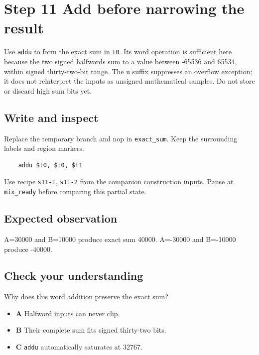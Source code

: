 \section{Step 11 Add before narrowing the result}\label{pcm-s11}

Use \texttt{addu} to form the exact sum in \texttt{t0}. Its word operation is sufficient here because the two signed halfwords sum to a value between -65536 and 65534, within signed thirty-two-bit range. The u suffix suppresses an overflow exception; it does not reinterpret the inputs as unsigned mathematical samples. Do not store or discard high sum bits yet.

\subsection{Write and inspect}
Replace the temporary branch and nop in \texttt{exact\_sum}. Keep the surrounding labels and region markers.

\begin{verbatim}
    addu $t0, $t0, $t1
\end{verbatim}
Use recipe \texttt{s11-1}, \texttt{s11-2} from the companion construction inputs. Pause at \texttt{mix\_ready} before comparing this partial state.

\subsection{Expected observation}
A=30000 and B=10000 produce exact sum 40000. A=-30000 and B=-10000 produce -40000.

\subsection{Check your understanding}
Why does this word addition preserve the exact sum?

\begin{itemize}
  \item \textbf{A} Halfword inputs can never clip.
  \item \textbf{B} Their complete sum fits signed thirty-two bits.
  \item \textbf{C} \texttt{addu} automatically saturates at 32767.
\end{itemize}
